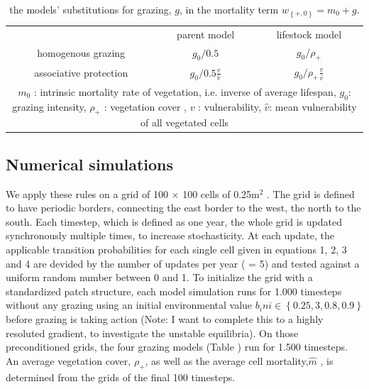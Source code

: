 \begin{table}[t!]
\label{tab:models}
\caption{the models' substitutions for grazing,  $g$, in the mortality term $w_{ \left\{ +,0 \right\} }  = m_0 + g$.  }
\centering
\begin{tabular}{ccc}

\toprule
 & parent model & lifestock model \\ \cmidrule(rl){2-2} \cmidrule(rl){3-3}
homogenous grazing &  $g_0/0.5$ & $g_0/\rho_+$\\
associative protection & $g_0/0.5 \frac{v}{\hat{v}}$  & $g_0/\rho_+ \frac{v}{\hat{v}}$ \\
	\bottomrule
\multicolumn{3}{p{9.5cm}}{\footnotesize $m_0$ : intrinsic mortality rate of vegetation, i.e. inverse of average lifespan, $g_0$: grazing intensity, $\rho_+$ : vegetation cover , $v$ : vulnerability, $\hat{v}$: mean vulnerability of all vegetated cells }
	\end{tabular}
\end{table}



\subsection{Numerical simulations}

We apply these rules on a grid of 100 $\times$  100 cells of 0.25m$^2$ . The grid is defined to have periodic borders, connecting the east border to the west, the north to the south. Each timestep, which is defined as one year, the whole grid is updated synchronously multiple times, to increase stochasticity. At each update, the applicable transition probabilities for each single cell given in equations 1, 2, 3 and 4 are devided by the number of updates per year ( = 5) and tested against a uniform random number between 0 and 1. To initialize the grid with a standardized patch structure, each model simulation runs for 1.000 timesteps without any grazing using an initial environmental value $b_ini \in \left\{ 0.25, 3, 0.8, 0.9 \right\}$ before grazing is taking action (Note: I want to complete this to a highly resoluted gradient, to investigate the unstable equilibria). On those preconditioned grids, the four grazing models (Table ) run for 1.500 timesteps. An average vegetation cover, $\rho_+$, as well as the average cell mortality,$\hat{m}$ , is determined from the grids of the final 100 timesteps.


